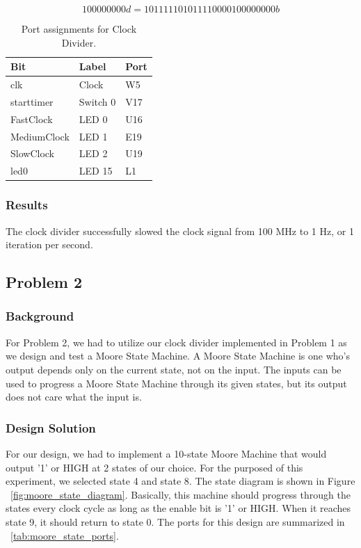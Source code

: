 \documentclass[11pt]{article}
\begin{document}
\begin{equation}
100 000 000d = 101111101011110000100000000b
\label{eqn:decimal_to_binary}
\end{equation}

\begin{table}[H]
\begin{center}
\begin{tabular}{| l | l | l |}
	\hline
	Bit & Label & Port \\ \hline
	clk & Clock & W5 \\ \hline
	starttimer & Switch 0 & V17 \\ \hline
	FastClock & LED 0 & U16 \\ \hline
	MediumClock & LED 1 & E19 \\ \hline
	SlowClock & LED 2 & U19 \\ \hline
	led0 & LED 15 & L1 \\ \hline
\end{tabular}
\caption{\label{tab:clockDividerPorts}Port assignments for Clock Divider.}
\end{center}
\end{table}

\subsubsection{Results}
The clock divider successfully slowed the clock signal from 100 MHz to 1 Hz, or 1 iteration per second.

\subsection{Problem 2 }

\subsubsection{Background}
For Problem 2, we had to utilize our clock divider implemented in Problem 1 as we design and test a Moore State Machine. A Moore State Machine is one who's output depends only on the current state, not on the input. The inputs can be used to progress a Moore State Machine through its given states, but its output does not care what the input is. 

\subsubsection{Design Solution}
For our design, we had to implement a 10-state Moore Machine that would output '1' or HIGH at 2 states of our choice. For the purposed of this experiment, we selected state 4 and state 8. The state diagram is shown in Figure ~\ref{fig:moore_state_diagram}. Basically, this machine should progress through the states every clock cycle as long as the enable bit is '1' or HIGH. When it reaches state 9, it should return to state 0. The ports for this design are summarized in ~\ref{tab:moore_state_ports}.
\end{document}
